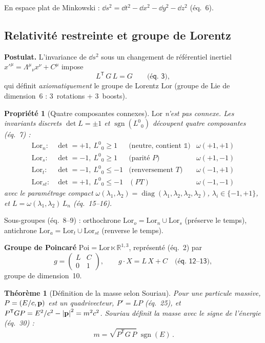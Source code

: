 \documentclass[11pt,a4paper]{article}
\theoremstyle{definition}
\theoremstyle{plain}
\newtheorem{theoreme}{Théorème}[section]
\newtheorem{propriete}{Propriété}[section]
\newcommand{\sgn}{\operatorname{sgn}}
\newcommand{\diag}{\operatorname{diag}}
\newcommand{\Lor}{\mathrm{Lor}}
\newcommand{\Poi}{\mathrm{Poi}}
\newcommand{\eqpaper}[1]{\textsf{(éq.~#1)}}   %
\begin{document}
En espace plat de Minkowski : $\dd s^2=\dd t^2-\dd x^2-\dd y^2-\dd z^2$ \eqpaper{6}.

\subsection{Relativité restreinte et groupe de Lorentz}

\textbf{Postulat.} L'invariance de $\dd s^2$ sous un changement de référentiel inertiel
$x'^\mu=\Lambda^\mu{}_\nu x^\nu+C^\mu$ impose
\begin{equation}
L^{\mathsf T}\,G\,L=G \qquad\eqpaper{3},
\label{eq:lorentz}
\end{equation}
qui définit \emph{axiomatiquement} le groupe de Lorentz $\Lor$ (groupe de Lie de dimension~6 :
3~rotations + 3~boosts).

\begin{propriete}[Quatre composantes connexes]
$\Lor$ n'est pas connexe. Les invariants discrets $\det L=\pm1$ et $\sgn(L^0{}_0)$ découpent
quatre composantes \eqpaper{7} :
\[
\begin{array}{llll}
\Lor_n: & \det=+1,\ L^0{}_0\ge1 & \text{(neutre, contient } \mathbb 1) & \omega(+1,+1)\\
\Lor_s: & \det=-1,\ L^0{}_0\ge1 & \text{(parité } P) & \omega(+1,-1)\\
\Lor_t: & \det=-1,\ L^0{}_0\le-1 & \text{(renversement } T) & \omega(-1,+1)\\
\Lor_{st}: & \det=+1,\ L^0{}_0\le-1 & (PT) & \omega(-1,-1)
\end{array}
\]
avec le paramétrage compact $\omega(\lambda_1,\lambda_2)=\diag(\lambda_1,\lambda_2,\lambda_2,\lambda_2)$,
$\lambda_i\in\{-1,+1\}$, et $L=\omega(\lambda_1,\lambda_2)\,L_n$ \eqpaper{15--16}.
\end{propriete}

Sous-groupes \eqpaper{8--9} : orthochrone $\Lor_o=\Lor_n\cup\Lor_s$ (préserve le temps),
antichrone $\Lor_a=\Lor_t\cup\Lor_{st}$ (renverse le temps).

\textbf{Groupe de Poincaré} $\Poi=\Lor\ltimes\mathbb R^{1,3}$, représenté \eqpaper{2} par
\begin{equation}
g=\begin{pmatrix} L & C\\ 0 & 1\end{pmatrix},\qquad
g\cdot X = L\,X + C \quad\eqpaper{12--13},
\end{equation}
groupe de dimension~10.

\begin{theoreme}[Définition de la masse selon Souriau]
\label{th:masse}
Pour une particule massive, $P=(E/c,\vb p)$ est un quadrivecteur, $P'=LP$ \eqpaper{25}, et
$P^{\mathsf T}GP=E^2/c^2-\abs{\vb p}^2=m^2c^2$. Souriau \emph{définit} la masse avec le signe
de l'énergie \eqpaper{30} :
\begin{equation}
\boxed{\,m=\sqrt{P^{\mathsf T}G\,P}\;\sgn(E)\,}.
\label{eq:masse}
\end{equation}
\end{theoreme}
\end{document}
